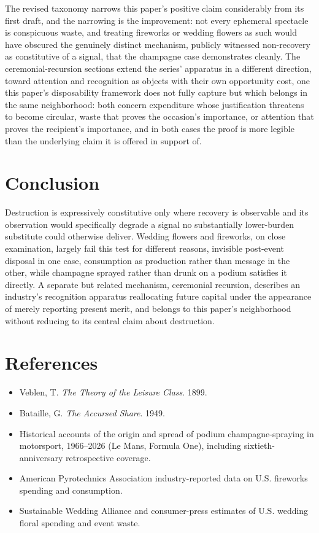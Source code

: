 \documentclass[11pt]{article}
\begin{document}
The revised taxonomy narrows this paper's positive claim considerably from its first draft, and the narrowing is the improvement: not every ephemeral spectacle is conspicuous waste, and treating fireworks or wedding flowers as such would have obscured the genuinely distinct mechanism, publicly witnessed non-recovery as constitutive of a signal, that the champagne case demonstrates cleanly. The ceremonial-recursion sections extend the series' apparatus in a different direction, toward attention and recognition as objects with their own opportunity cost, one this paper's disposability framework does not fully capture but which belongs in the same neighborhood: both concern expenditure whose justification threatens to become circular, waste that proves the occasion's importance, or attention that proves the recipient's importance, and in both cases the proof is more legible than the underlying claim it is offered in support of.

\section{Conclusion}

Destruction is expressively constitutive only where recovery is observable and its observation would specifically degrade a signal no substantially lower-burden substitute could otherwise deliver. Wedding flowers and fireworks, on close examination, largely fail this test for different reasons, invisible post-event disposal in one case, consumption as production rather than message in the other, while champagne sprayed rather than drunk on a podium satisfies it directly. A separate but related mechanism, ceremonial recursion, describes an industry's recognition apparatus reallocating future capital under the appearance of merely reporting present merit, and belongs to this paper's neighborhood without reducing to its central claim about destruction.

\section*{References}
\begin{itemize}[nosep]
\item Veblen, T. \emph{The Theory of the Leisure Class}. 1899.
\item Bataille, G. \emph{The Accursed Share}. 1949.
\item Historical accounts of the origin and spread of podium champagne-spraying in motorsport, 1966--2026 (Le Mans, Formula One), including sixtieth-anniversary retrospective coverage.
\item American Pyrotechnics Association industry-reported data on U.S. fireworks spending and consumption.
\item Sustainable Wedding Alliance and consumer-press estimates of U.S. wedding floral spending and event waste.
\end{itemize}
\end{document}
